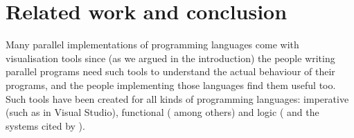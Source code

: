 \section{Related work and conclusion}
\label{sec:tscope_conc}

%
%
%
%


Many parallel implementations of programming languages
come with visualisation tools
since (as we argued in the introduction)
the people writing parallel programs
need such tools to understand the actual behaviour of their programs,
and the people implementing those languages find them useful too.
Such tools have been created for all kinds of programming languages:
imperative (such as in Visual Studio),
functional
(\citet{edentraceviewer,loidl98:gransim,runciman93:profilingparfp} among others)
and logic (\citet{Foster96,vace}
and the systems cited by \citet{Gupta95parallelexecution}).

